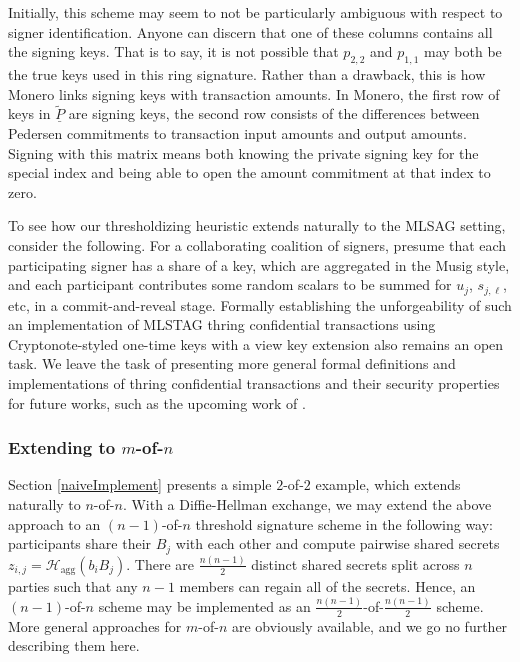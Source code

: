 \documentclass{mrl}
\theoremstyle{definition}
\numberwithin{theorem}{subsection}
\begin{document}
Initially, this scheme may seem to not be particularly ambiguous with respect to signer identification. Anyone can discern that one of these columns contains all the signing keys. That is to say, it is not possible that $p_{2,2}$ and $p_{1,1}$ may both be the true keys used in this ring signature. Rather than a drawback, this is how Monero links signing keys with transaction amounts. In Monero, the first row of keys in $\widetilde{\underline{P}}$ are signing keys, the second row consists of the differences between Pedersen commitments to transaction input amounts and output amounts. Signing with this matrix means both knowing the private signing key for the special index and being able to open the amount commitment at that index to zero.

To see how our thresholdizing heuristic extends naturally to the MLSAG setting, consider the following. For a collaborating coalition of signers, presume that each participating signer has a share of a key, which are aggregated in the Musig style, and each participant contributes some random scalars to be summed for $u_j$, $s_{j,\ell}$, etc, in a commit-and-reveal stage. Formally establishing the unforgeability of such an implementation of MLSTAG thring confidential transactions using Cryptonote-styled one-time keys with a view key extension also remains an open task. We leave the task of presenting more general formal definitions and implementations of thring confidential transactions and their security properties for future works, such as the upcoming work of \cite{ruffct2}.














\subsubsection{Extending to $m$-of-$n$}

Section \ref{naiveImplement} presents a simple $2$-of-$2$ example, which extends naturally to $n$-of-$n$. With a Diffie-Hellman exchange, we may extend the above approach to an $(n-1)$-of-$n$ threshold signature scheme in the following way: participants share their $B_j$ with each other and compute pairwise shared secrets $z_{i,j} = \mathcal{H}_{\text{agg}}(b_i B_j)$. There are $\frac{n(n-1)}{2}$ distinct shared secrets split across $n$ parties such that any $n-1$ members can regain all of the secrets.  Hence, an $(n-1)$-of-$n$ scheme may be implemented as an $\frac{n(n-1)}{2}$-of-$\frac{n(n-1)}{2}$ scheme. More general approaches for $m$-of-$n$ are obviously available, and we go no further describing them here.
\end{document}
